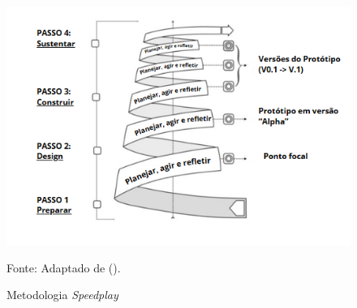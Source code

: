 \begin{figure}[H]
    \caption{Metodologia \textit{Speedplay}}
    \centering
    \includegraphics[width=\linewidth]{images/fundamentacao/speedplay.png}
    \label{fig:speedplay}
    
    Fonte: Adaptado de \citeauthor{ferrario2014} (\citeyear{ferrario2014}).
\end{figure}